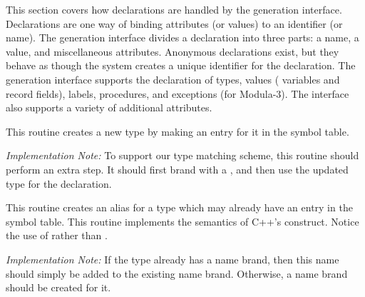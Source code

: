 \label{sec:decl}

This section covers how declarations are handled by the generation
interface.  Declarations are one way of binding attributes (or values)
to an identifier (or name).  The generation interface divides a
declaration into three parts: a name, a value, and miscellaneous
attributes.  Anonymous declarations exist, but they behave as though
the system creates a unique identifier for the declaration.  The
generation interface supports the declaration of types, values (\eg
variables and record fields), labels, procedures, and exceptions (for
Modula-3).  The interface also supports a variety of additional
attributes.




\begin{functionality}
  This routine creates a new type by making an entry for it in the
symbol table.  

\emph{Implementation Note:} To support our type matching scheme, this
routine should perform an extra step.  It should first brand 
with a , and then use the updated type for the
declaration.  
\end{functionality}

\begin{functionality}
  This routine creates an alias for a type which may already have an
entry in the symbol table.  This routine implements the semantics of
C++'s  construct.  Notice the use of  rather
than .

\emph{Implementation Note:} If the type already has a name brand, then
this name should simply be added to the existing name brand.
Otherwise, a name brand should be created for it.
\end{functionality}

